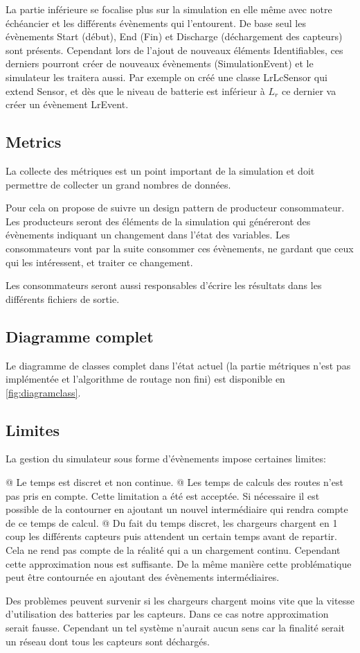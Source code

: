 \documentclass[final]{polytech/polytech}
\begin{document}
			La partie inférieure se focalise plus sur la simulation en elle même avec notre échéancier et les différents évènements qui l'entourent.
			De base seul les évènements Start (début), End (Fin) et Discharge (déchargement des capteurs) sont présents.
			Cependant lors de l'ajout de nouveaux éléments Identifiables, ces derniers pourront créer de nouveaux évènements (SimulationEvent) et le simulateur les traitera aussi.
			Par exemple on créé une classe LrLcSensor qui extend Sensor, et dès que le niveau de batterie est inférieur à $L_r$ ce dernier va créer un évènement LrEvent.
		
		\subsection{Metrics}
			La collecte des métriques est un point important de la simulation et doit permettre de collecter un grand nombres de données.
			
			Pour cela on propose de suivre un design pattern de producteur consommateur.
			Les producteurs seront des éléments de la simulation qui généreront des évènements indiquant un changement dans l'état des variables.
			Les consommateurs vont par la suite consommer ces évènements, ne gardant que ceux qui les intéressent, et traiter ce changement.
			
			Les consommateurs seront aussi responsables d'écrire les résultats dans les différents fichiers de sortie.
			
		\subsection{Diagramme complet}
			Le diagramme de classes complet dans l'état actuel (la partie métriques n'est pas implémentée et l'algorithme de routage non fini) est disponible en \autoref{fig:diagramclass}.
			
		\subsection{Limites}
			La gestion du simulateur sous forme d'évènements impose certaines limites:
			\begin{easylist}[itemize]
				@ Le temps est discret et non continue.
				@ Les temps de calculs des routes n'est pas pris en compte.
				Cette limitation a été est acceptée.
				Si nécessaire il est possible de la contourner en ajoutant un nouvel intermédiaire qui rendra compte de ce temps de calcul.
				@ Du fait du temps discret, les chargeurs chargent en 1 coup les différents capteurs puis attendent un certain temps avant de repartir.
				Cela ne rend pas compte de la réalité qui a un chargement continu.
				Cependant cette approximation nous est suffisante.
				De la même manière cette problématique peut être contournée en ajoutant des évènements intermédiaires.
				
				Des problèmes peuvent survenir si les chargeurs chargent moins vite que la vitesse d'utilisation des batteries par les capteurs.
				Dans ce cas notre approximation serait fausse.
				Cependant un tel système n'aurait aucun sens car la finalité serait un réseau dont tous les capteurs sont déchargés.
			\end{easylist}
\end{document}
